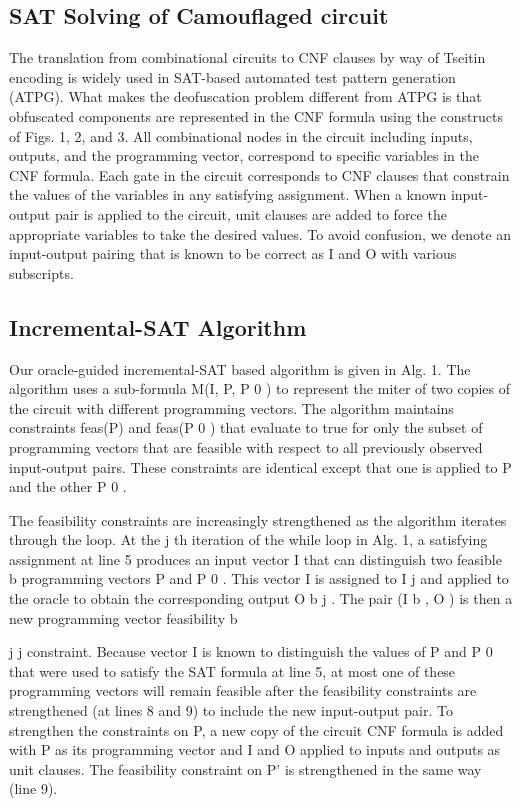 \documentclass[proposal]{umassthesis}  %
\begin{document}
\subsection{SAT Solving of Camouflaged circuit}
The translation from combinational circuits to CNF clauses by way of Tseitin encoding is widely used in SAT-based automated test pattern generation (ATPG). What makes the deofuscation problem different from ATPG is that obfuscated components are represented in the CNF formula using the constructs of Figs. 1, 2, and 3. All combinational nodes in the circuit including inputs, outputs, and the programming vector, correspond to specific variables in the CNF formula. Each gate in the circuit corresponds to CNF clauses that constrain the values of the variables in any satisfying assignment. When a known input-output pair is applied to the circuit, unit clauses are added to force the appropriate variables to take the desired values. To avoid confusion, we denote an input-output pairing that is known to be correct as I and O with various subscripts.

\subsection{Incremental-SAT Algorithm}
Our oracle-guided incremental-SAT based algorithm is given in Alg. 1. The algorithm uses a sub-formula M(I, P, P 0 ) to represent the miter of two copies of the circuit with different programming vectors. The algorithm maintains constraints feas(P) and feas(P 0 ) that evaluate to true for only the subset of programming vectors that are feasible with respect to all previously observed input-output pairs. These constraints are identical except that one is applied to P and the other P 0 .

The feasibility constraints are increasingly strengthened as the algorithm iterates through the loop. At the j th iteration of the while loop in Alg. 1, a satisfying assignment at line 5 produces an input vector I that can distinguish two feasible b programming vectors P and P 0 . This vector I is assigned to I j and applied to the oracle to obtain the corresponding output O b j . The pair (I b , O ) is then a new programming vector feasibility b

j j constraint. Because vector I is known to distinguish the values of P and P 0 that were used to satisfy the SAT formula at line 5, at most one of these programming vectors will remain feasible after the feasibility constraints are strengthened (at lines 8 and 9) to include the new input-output pair. To strengthen the constraints on P, a new copy of the circuit CNF formula is added with P as its programming vector and I and O applied to inputs and outputs as unit clauses. The feasibility constraint on P' is strengthened in the 
same way (line 9).
\end{document}
